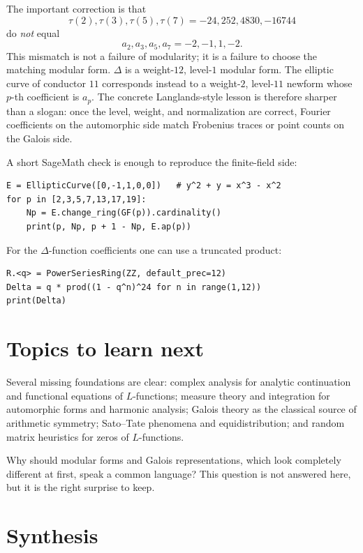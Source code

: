 The important correction is that
\[
  \tau(2),\tau(3),\tau(5),\tau(7)
  =
  -24,252,4830,-16744
\]
do \emph{not} equal
\[
  a_2,a_3,a_5,a_7=-2,-1,1,-2.
\]
This mismatch is not a failure of modularity; it is a failure to choose the matching modular form.  \(\Delta\) is a weight-\(12\), level-\(1\) modular form.  The elliptic curve of conductor \(11\) corresponds instead to a weight-\(2\), level-\(11\) newform whose \(p\)-th coefficient is \(a_p\).  The concrete Langlands-style lesson is therefore sharper than a slogan: once the level, weight, and normalization are correct, Fourier coefficients on the automorphic side match Frobenius traces or point counts on the Galois side.

A short SageMath check is enough to reproduce the finite-field side:
\begin{verbatim}
E = EllipticCurve([0,-1,1,0,0])   # y^2 + y = x^3 - x^2
for p in [2,3,5,7,13,17,19]:
    Np = E.change_ring(GF(p)).cardinality()
    print(p, Np, p + 1 - Np, E.ap(p))
\end{verbatim}
For the \(\Delta\)-function coefficients one can use a truncated product:
\begin{verbatim}
R.<q> = PowerSeriesRing(ZZ, default_prec=12)
Delta = q * prod((1 - q^n)^24 for n in range(1,12))
print(Delta)
\end{verbatim}

\section{Topics to learn next}

Several missing foundations are clear: complex analysis for analytic continuation and functional equations of \(L\)-functions; measure theory and integration for automorphic forms and harmonic analysis; Galois theory as the classical source of arithmetic symmetry; Sato--Tate phenomena and equidistribution; and random matrix heuristics for zeros of \(L\)-functions.

\begin{question}
Why should modular forms and Galois representations, which look completely different at first, speak a common language?  This question is not answered here, but it is the right surprise to keep.
\end{question}

\section{Synthesis}

